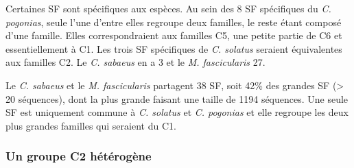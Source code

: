 \documentclass[12pt,a4paper]{article}
\begin{document}
	Certaines SF sont spécifiques aux espèces. Au sein des 8 SF spécifiques du \textit{C. pogonias}, seule l'une d'entre elles regroupe deux familles, le reste étant composé d'une famille. Elles correspondraient aux familles C5, une petite partie de C6 et essentiellement à C1. Les trois SF spécifiques de \textit{C. solatus} seraient équivalentes aux familles C2. Le \textit{C. sabaeus} en a 3 et le \textit{M. fascicularis} 27.
	
	Le \textit{C. sabaeus} et le \textit{M. fascicularis} partagent 38 SF, soit 42\% des grandes SF (> 20 séquences), dont la plus grande faisant une taille de 1194 séquences. Une seule SF est uniquement commune à \textit{C. solatus} et \textit{C. pogonias} et elle regroupe les deux plus grandes familles qui seraient du C1.
	
	\subsubsection{Un groupe C2 hétérogène}
\end{document}
